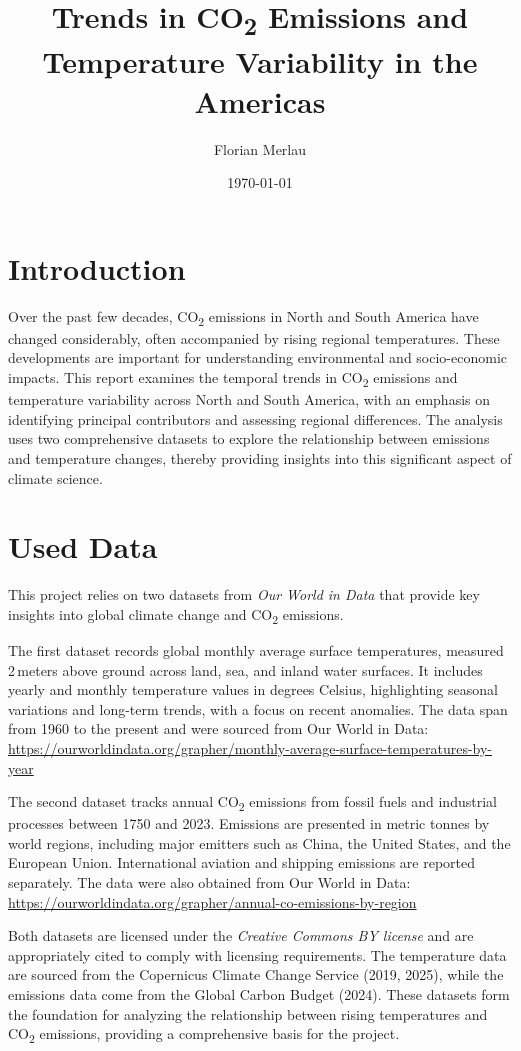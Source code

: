 \documentclass[a4paper,12pt]{article}
\title{Trends in CO\textsubscript{2} Emissions and Temperature Variability in the Americas}
\author{Florian Merlau}
\date{\today}
\begin{document}
\maketitle

\section{Introduction}
Over the past few decades, CO\textsubscript{2} emissions in North and South America have changed considerably, often accompanied by rising regional temperatures. These developments are important for understanding environmental and socio-economic impacts. This report examines the temporal trends in CO\textsubscript{2} emissions and temperature variability across North and South America, with an emphasis on identifying principal contributors and assessing regional differences. The analysis uses two comprehensive datasets to explore the relationship between emissions and temperature changes, thereby providing insights into this significant aspect of climate science. 

\section{Used Data}
This project relies on two datasets from \textit{Our World in Data} that provide key insights into global climate change and CO\textsubscript{2} emissions.

\noindent
The first dataset records global monthly average surface temperatures, measured 2\,meters above ground across land, sea, and inland water surfaces. It includes yearly and monthly temperature values in degrees Celsius, highlighting seasonal variations and long-term trends, with a focus on recent anomalies. The data span from 1960 to the present and were sourced from Our World in Data:  
\url{https://ourworldindata.org/grapher/monthly-average-surface-temperatures-by-year}

\noindent
The second dataset tracks annual CO\textsubscript{2} emissions from fossil fuels and industrial processes between 1750 and 2023. Emissions are presented in metric tonnes by world regions, including major emitters such as China, the United States, and the European Union. International aviation and shipping emissions are reported separately. The data were also obtained from Our World in Data:  
\url{https://ourworldindata.org/grapher/annual-co-emissions-by-region}

\noindent
Both datasets are licensed under the \textit{Creative Commons BY license} and are appropriately cited to comply with licensing requirements. The temperature data are sourced from the Copernicus Climate Change Service (2019, 2025), while the emissions data come from the Global Carbon Budget (2024). These datasets form the foundation for analyzing the relationship between rising temperatures and CO\textsubscript{2} emissions, providing a comprehensive basis for the project.
\end{document}
